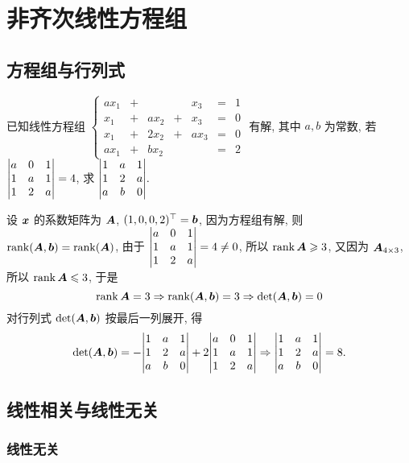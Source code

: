 \section{非齐次线性方程组}

\subsection{方程组与行列式}

\begin{example}
    已知线性方程组 $\left\{\begin{matrix}
            ax_1 & + &      &   & x_3  & = & 1 \\
            x_1  & + & ax_2 & + & x_3  & = & 0 \\
            x_1  & + & 2x_2 & + & ax_3 & = & 0 \\
            ax_1 & + & bx_2 &   &      & = & 2
        \end{matrix}\right.$ 有解, 其中 $a,b$ 为常数, 若 $\mqty|a&0&1\\1&a&1\\1&2&a|=4$, 求 $\mqty|1&a&1\\1&2&a\\a&b&0|.$
\end{example}
\begin{solution}
    设 $\vb*{x}$ 的系数矩阵为 $\vb*{A}$, $(1,0,0,2)^\top=\vb*{b}$, 因为方程组有解, 则 $\rank(\vb*{A},\vb*{b})=\rank(\vb*{A})$, 由于 $\mqty|a&0&1\\1&a&1\\1&2&a|=4\neq0$, 所以 $\rank\vb*{A}\geqslant 3$,
    又因为 $\vb*{A}_{4\times3}$, 所以 $\rank\vb*{A}\leqslant 3$, 于是 $$\rank\vb*{A}=3\Rightarrow \rank(\vb*{A},\vb*{b})=3\Rightarrow\det(\vb*{A},\vb*{b})=0$$
    对行列式 $\det(\vb*{A},\vb*{b})$ 按最后一列展开, 得
    $$\det(\vb*{A},\vb*{b})=-\mqty|1&a&1\\1&2&a\\a&b&0|+2\mqty|a&0&1\\1&a&1\\1&2&a|\Rightarrow\mqty|1&a&1\\1&2&a\\a&b&0|=8. $$
\end{solution}

\subsection{线性相关与线性无关}

\subsubsection{线性无关}

